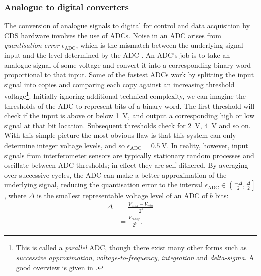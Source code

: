 \subsubsection{\label{sec:adcs-and-dacs}Analogue to digital converters}
The conversion of analogue signals to digital for control and data acquisition by \gls{CDS} hardware involves the use of \glspl{ADC}. Noise in an \gls{ADC} arises from \emph{quantisation error} $\epsilon_{\text{ADC}}$, which is the mismatch between the underlying signal input and the level determined by the \gls{ADC} \cite{Allen1997}. An \gls{ADC}'s job is to take an analogue signal of some voltage and convert it into a corresponding binary word proportional to that input. Some of the fastest \glspl{ADC} work by splitting the input signal into copies and comparing each copy against an increasing threshold voltage\footnote{This is called a \emph{parallel} \gls{ADC}, though there exist many other forms such as \emph{successive approximation}, \emph{voltage-to-frequency}, \emph{integration} and \emph{delta-sigma}. A good overview is given in \cite{Horowitz2015}.}. Initially ignoring additional technical complexity, we can imagine the thresholds of the \gls{ADC} to represent bits of a binary word. The first threshold will check if the input is above or below \SI{1}{\volt}, and output a corresponding high or low signal at that bit location. Subsequent thresholds check for \SI{2}{\volt}, \SI{4}{\volt} and so on. With this simple picture the most obvious flaw is that this system can only determine integer voltage levels, and so $\epsilon_{\text{ADC}} = \SI{0.5}{\volt}$. In reality, however, input signals from interferometer sensors are typically stationary random processes and oscillate between \gls{ADC} thresholds; in effect they are self-dithered. By averaging over successive cycles, the \gls{ADC} can make a better approximation of the underlying signal, reducing the quantisation error to the interval $\epsilon_{\text{ADC}} \in \left( \frac{-\Delta}{2}, \frac{\Delta}{2} \right]$ \cite{Allen1997}, where $\Delta$ is the smallest representable voltage level of an \gls{ADC} of $b$ bits:
\begin{equation}
  \begin{split}
    \Delta &= \frac{V_{\text{max}} - V_{\text{min}}}{2^{b}} \\
           &= \frac{V_{\text{range}}}{2^{b}}.
  \end{split}
\end{equation}


